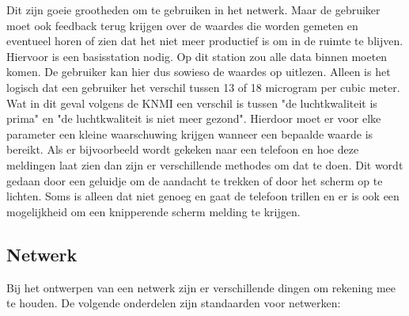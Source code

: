 Dit zijn goeie grootheden om te gebruiken in het netwerk. Maar de gebruiker moet ook feedback terug krijgen over de waardes die worden
gemeten en eventueel horen of zien dat het niet meer productief is om in de ruimte te blijven. Hiervoor is een basisstation nodig. 
Op dit station zou alle data binnen moeten komen. De gebruiker kan hier dus sowieso de waardes op uitlezen. Alleen is het logisch dat
een gebruiker het verschil tussen 13 of 18 microgram per cubic meter. Wat in dit geval volgens de KNMI \cite{Gezonde} een verschil is tussen
"de luchtkwaliteit is prima" en "de luchtkwaliteit is niet meer gezond". Hierdoor moet er voor elke parameter een kleine waarschuwing krijgen
wanneer een bepaalde waarde is bereikt. Als er bijvoorbeeld wordt gekeken naar een telefoon en hoe deze meldingen laat zien dan zijn er 
verschillende methodes om dat te doen. Dit wordt gedaan door een geluidje om de aandacht te trekken of door het scherm op te lichten. Soms
is alleen dat niet genoeg en gaat de telefoon trillen en er is ook een mogelijkheid om een knipperende scherm melding te krijgen.


\subsection{Netwerk}

Bij het ontwerpen van een netwerk zijn er verschillende dingen om rekening mee te houden. De volgende onderdelen zijn standaarden voor netwerken: 

